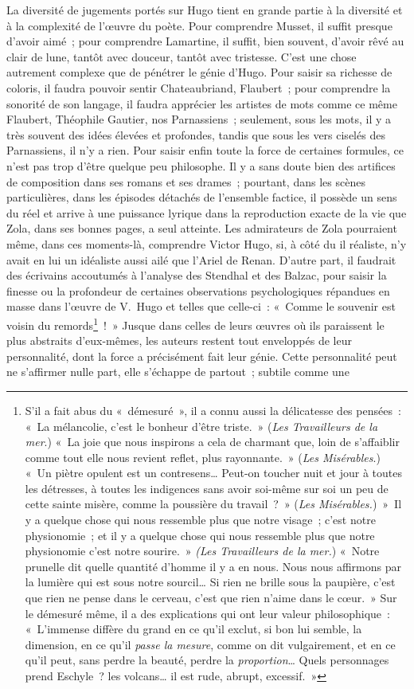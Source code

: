 \documentclass[french,twoside]{book} %
\begin{document}
La diversité de jugements portés sur Hugo tient en grande partie à la diversité et à la complexité de l’œuvre du poète. Pour comprendre Musset, il suffit presque d’avoir aimé ; pour comprendre Lamartine, il suffit, bien souvent, d’avoir rêvé au clair de lune, tantôt avec douceur, tantôt avec tristesse. C’est une chose autrement complexe que de pénétrer le génie d’Hugo. Pour saisir sa richesse de coloris, il faudra pouvoir sentir Chateaubriand, Flaubert ; pour comprendre la sonorité de son langage, il faudra apprécier les artistes de mots comme ce même Flaubert, Théophile Gautier, nos Parnassiens ; seulement, sous les mots, il y a très souvent des idées élevées et profondes, tandis que sous les vers ciselés des Parnassiens, il n’y a rien. Pour saisir enfin toute la force de certaines formules, ce n’est pas trop d’être quelque peu philosophe. Il y a sans doute bien des artifices de composition dans ses romans et ses drames ; pourtant, dans les scènes particulières, dans les épisodes détachés de l’ensemble factice, il possède un sens du réel et arrive à une puissance lyrique dans la reproduction exacte de la vie que Zola, dans ses bonnes pages, a seul atteinte. Les admirateurs de Zola pourraient même, dans ces moments-là, comprendre Victor Hugo, si, à côté du il réaliste, n’y avait en lui un idéaliste aussi ailé que l’Ariel de Renan. D’autre part, il faudrait des écrivains accoutumés à l’analyse des Stendhal et des Balzac, pour saisir la finesse ou la profondeur de certaines observations psychologiques répandues en masse dans l’œuvre de V. Hugo et telles que celle-ci : « Comme le souvenir est voisin du remords\footnote{ S’il a fait abus du « démesuré », il a connu aussi la délicatesse des pensées : « La mélancolie, c’est le bonheur d’être triste. » (\emph{Les Travailleurs de la mer}.) « La joie que nous inspirons a cela de charmant que, loin de s’affaiblir comme tout elle nous revient reflet, plus rayonnante. » ({\itshape Les Misérables}.) « Un piètre opulent est un contresens… Peut-on toucher nuit et jour à toutes les détresses, à toutes les indigences sans avoir soi-même sur soi un peu de cette sainte misère, comme la poussière du travail ? » (\emph{Les Misérables.}) » Il y a quelque chose qui nous ressemble plus que notre visage ; c’est notre physionomie ; et il y a quelque chose qui nous ressemble plus que notre physionomie c’est notre sourire. » \emph{(Les Travailleurs de la mer.}) « Notre prunelle dit quelle quantité d’homme il y a en nous. Nous nous affirmons par la lumière qui est sous notre sourcil… Si rien ne brille sous la paupière, c’est que rien ne pense dans le cerveau, c’est que rien n’aime dans le cœur. » Sur le démesuré même, il a des explications qui ont leur valeur philosophique : « L’immense diffère du grand en ce qu’il exclut, si bon lui semble, la dimension, en ce qu’il \emph{passe la mesure}, comme on dit vulgairement, et en ce qu’il peut, sans perdre la beauté, perdre la \emph{proportion}… Quels personnages prend Eschyle ? les volcans… il est rude, abrupt, excessif. »} ! » Jusque dans celles de leurs œuvres où ils paraissent le plus abstraits d’eux-mêmes, les auteurs restent tout enveloppés de leur personnalité, dont la force a précisément fait leur génie. Cette personnalité peut ne s’affirmer nulle part, elle s’échappe de partout ; subtile comme une 
\end{document}
